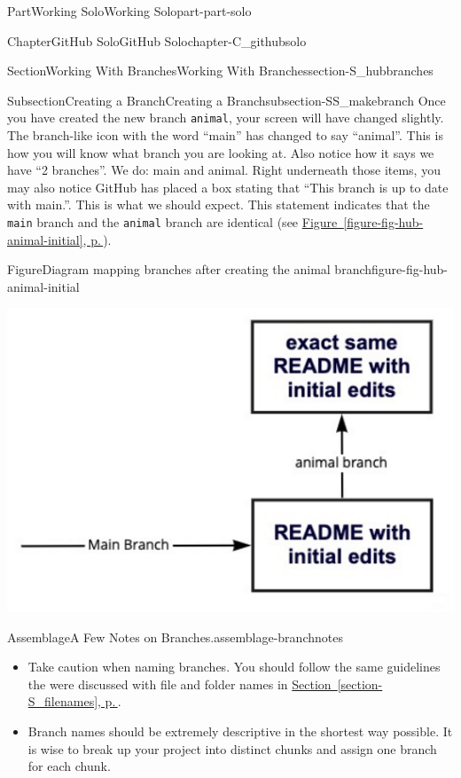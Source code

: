 \documentclass[twoside,10pt,]{book}
\newcommand{\xreffont}{\relax}
\newcommand{\mono}[1]{\texttt{#1}}
\begin{document}
\begin{partptx}{Part}{Working Solo}{}{Working Solo}{}{}{part-part-solo}
\begin{chapterptx}{Chapter}{GitHub Solo}{}{GitHub Solo}{}{}{chapter-C_githubsolo}
\begin{sectionptx}{Section}{Working With Branches}{}{Working With Branches}{}{}{section-S_hubbranches}
\begin{subsectionptx}{Subsection}{Creating a Branch}{}{Creating a Branch}{}{}{subsection-SS_makebranch}
Once you have created the new branch \mono{animal}, your screen will have changed slightly. The branch-like icon with the word ``main'' has changed to say ``animal''. This is how you will know what branch you are looking at. Also notice how it says we have ``2 branches''. We do: main and animal. Right underneath those items, you may also notice GitHub has placed a box stating that ``This branch is up to date with main.''. This is what we should expect. This statement indicates that the \mono{main} branch and the \mono{animal} branch are identical (see \hyperref[figure-fig-hub-animal-initial]{Figure~{\xreffont\ref{figure-fig-hub-animal-initial}}, p.\,\pageref{figure-fig-hub-animal-initial}}).%
\begin{figureptx}{Figure}{Diagram mapping branches after creating the animal branch}{figure-fig-hub-animal-initial}{}%
\begin{image}{0.15}{0.7}{0.15}{}%
\includegraphics[width=\linewidth]{external/hub_animal_initial.pdf}
\end{image}%
\tcblower
\end{figureptx}%
\begin{assemblage}{Assemblage}{A Few Notes on Branches.}{assemblage-branchnotes}%
%
\begin{itemize}[label=\textbullet]
\item{}Take caution when naming branches. You should follow the same guidelines the were discussed with file and folder names in \hyperref[section-S_filenames]{Section~{\xreffont\ref{section-S_filenames}}, p.\,\pageref{section-S_filenames}}.%
\item{}Branch names should be extremely descriptive in the shortest way possible. It is wise to break up your project into distinct chunks and assign one branch for each chunk.%

\end{itemize}
\end{assemblage}
\end{subsectionptx}
\end{sectionptx}
\end{chapterptx}
\end{partptx}
\end{document}
